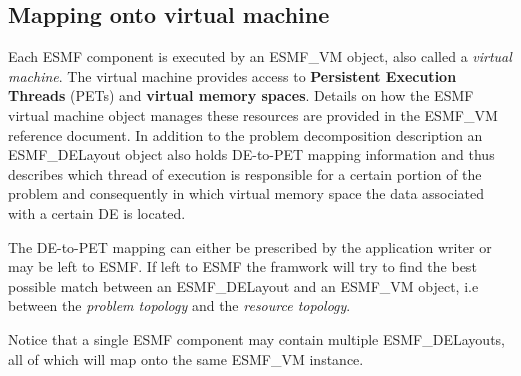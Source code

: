 \subsection{Mapping onto virtual machine}
Each ESMF component is executed by an ESMF\_VM object, also called a {\em virtual machine}. The virtual machine provides access to {\bf Persistent Execution Threads} (PETs) and {\bf virtual memory spaces}. Details on how the ESMF virtual machine object manages these resources are provided in the ESMF\_VM reference document. In addition to the problem decomposition description an ESMF\_DELayout object also holds DE-to-PET mapping information and thus describes which thread of execution is responsible for a certain portion of the problem and consequently in which virtual memory space the data associated with a certain DE is located.

The DE-to-PET mapping can either be prescribed by the application writer or may be left to ESMF. If left to ESMF the framwork will try to find the best possible match between an ESMF\_DELayout and an ESMF\_VM object, i.e between the {\em problem topology} and the {\em resource topology}.

Notice that a single ESMF component may contain multiple ESMF\_DELayouts, all of which will map onto the same ESMF\_VM instance. 






